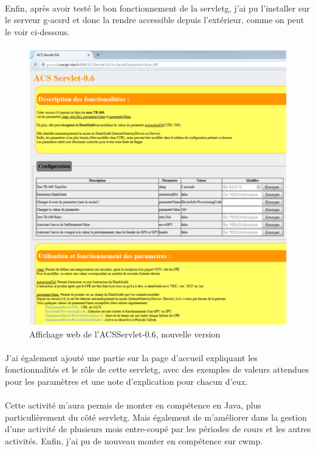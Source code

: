 \documentclass[12pt,a4paper]{report}
\begin{document}
\paragraph*{}Enfin, après avoir testé le bon fonctionnement de la \gls{servletg}, j’ai pu l’installer sur le serveur g-acsrd et donc la rendre accessible depuis l’extérieur, comme on peut le voir ci-dessous.
\paragraph*{}
\begin{figure}[!ht]
    \center
    \includegraphics[scale=0.74]{./img/acs_servlet_06.png}
    \caption{Affichage web de l’ACSServlet-0.6, nouvelle version}
\end{figure}
\newpage
\paragraph*{}J’ai également ajouté une partie sur la page d'accueil expliquant les fonctionnalités et le rôle de cette \gls{servletg}, avec des exemples de valeurs attendues pour les paramètres et une note d'explication pour chacun d’eux.
\paragraph*{}Cette activité m’aura permis de monter en compétence en Java, plus particulièrement du côté \gls{servletg}. Mais également de m’améliorer dans la gestion d’une activité de plusieurs mois entre-coupé par les périodes de cours et les autres activités. Enfin, j’ai pu de nouveau monter en compétence sur \gls{cwmp}. \\
\end{document}
